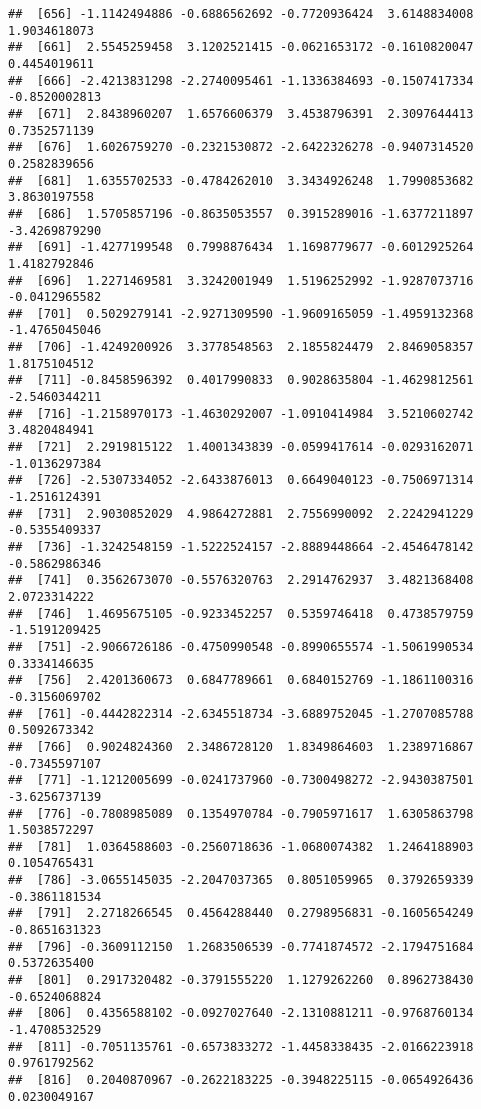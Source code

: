 \documentclass[
]{article}
\begin{document}
\begin{verbatim}
##  [656] -1.1142494886 -0.6886562692 -0.7720936424  3.6148834008  1.9034618073
##  [661]  2.5545259458  3.1202521415 -0.0621653172 -0.1610820047  0.4454019611
##  [666] -2.4213831298 -2.2740095461 -1.1336384693 -0.1507417334 -0.8520002813
##  [671]  2.8438960207  1.6576606379  3.4538796391  2.3097644413  0.7352571139
##  [676]  1.6026759270 -0.2321530872 -2.6422326278 -0.9407314520  0.2582839656
##  [681]  1.6355702533 -0.4784262010  3.3434926248  1.7990853682  3.8630197558
##  [686]  1.5705857196 -0.8635053557  0.3915289016 -1.6377211897 -3.4269879290
##  [691] -1.4277199548  0.7998876434  1.1698779677 -0.6012925264  1.4182792846
##  [696]  1.2271469581  3.3242001949  1.5196252992 -1.9287073716 -0.0412965582
##  [701]  0.5029279141 -2.9271309590 -1.9609165059 -1.4959132368 -1.4765045046
##  [706] -1.4249200926  3.3778548563  2.1855824479  2.8469058357  1.8175104512
##  [711] -0.8458596392  0.4017990833  0.9028635804 -1.4629812561 -2.5460344211
##  [716] -1.2158970173 -1.4630292007 -1.0910414984  3.5210602742  3.4820484941
##  [721]  2.2919815122  1.4001343839 -0.0599417614 -0.0293162071 -1.0136297384
##  [726] -2.5307334052 -2.6433876013  0.6649040123 -0.7506971314 -1.2516124391
##  [731]  2.9030852029  4.9864272881  2.7556990092  2.2242941229 -0.5355409337
##  [736] -1.3242548159 -1.5222524157 -2.8889448664 -2.4546478142 -0.5862986346
##  [741]  0.3562673070 -0.5576320763  2.2914762937  3.4821368408  2.0723314222
##  [746]  1.4695675105 -0.9233452257  0.5359746418  0.4738579759 -1.5191209425
##  [751] -2.9066726186 -0.4750990548 -0.8990655574 -1.5061990534  0.3334146635
##  [756]  2.4201360673  0.6847789661  0.6840152769 -1.1861100316 -0.3156069702
##  [761] -0.4442822314 -2.6345518734 -3.6889752045 -1.2707085788  0.5092673342
##  [766]  0.9024824360  2.3486728120  1.8349864603  1.2389716867 -0.7345597107
##  [771] -1.1212005699 -0.0241737960 -0.7300498272 -2.9430387501 -3.6256737139
##  [776] -0.7808985089  0.1354970784 -0.7905971617  1.6305863798  1.5038572297
##  [781]  1.0364588603 -0.2560718636 -1.0680074382  1.2464188903  0.1054765431
##  [786] -3.0655145035 -2.2047037365  0.8051059965  0.3792659339 -0.3861181534
##  [791]  2.2718266545  0.4564288440  0.2798956831 -0.1605654249 -0.8651631323
##  [796] -0.3609112150  1.2683506539 -0.7741874572 -2.1794751684  0.5372635400
##  [801]  0.2917320482 -0.3791555220  1.1279262260  0.8962738430 -0.6524068824
##  [806]  0.4356588102 -0.0927027640 -2.1310881211 -0.9768760134 -1.4708532529
##  [811] -0.7051135761 -0.6573833272 -1.4458338435 -2.0166223918  0.9761792562
##  [816]  0.2040870967 -0.2622183225 -0.3948225115 -0.0654926436  0.0230049167

\end{verbatim}
\end{document}
